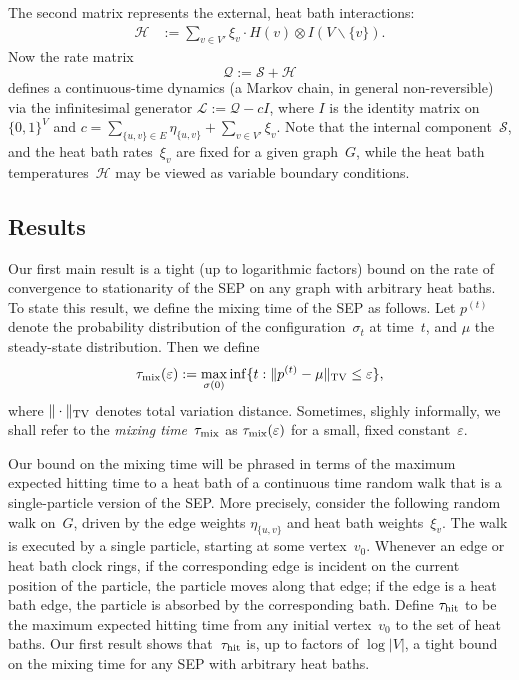 \documentclass[11pt]{article}
\theoremstyle{plain}
\theoremstyle{definition}
\theoremstyle{remark}
\numberwithin{equation}{section}
\newcommand{\cH}{{\mathcal H}}
\newcommand{\cL}{{\mathcal L}}
\newcommand{\cS}{{\mathcal S}}
\newcommand{\be}{\begin{equation}}
\newcommand{\ee}{\end{equation}}
\renewcommand{\cS}{{\mathcal Q}}
\newcommand{\cSin}{{\mathcal S}}
\newcommand{\tmix}{\tau_{\rm mix}}
\newcommand{\hit}{\tau_{\rm hit}}
\newcommand{\TVD}[2]{\Vert #1 - #2 \Vert_{\rm TV}}
\begin{document}
The second matrix represents the external, heat bath interactions:
\begin{align} \cH &:= \sum_{v \in V'} \xi_{v} \cdot H(v) \otimes I({V\backslash \{v\}})
\label{Hh}. \end{align}
Now the rate matrix \be \cS:=\cSin+\cH \label{cSdef} \ee
defines a continuous-time dynamics (a Markov chain, in general non-reversible) via the infinitesimal generator $\cL := \cS-cI$,
where $I$ is the identity matrix on $\{0,1\}^V$ and $c=\sum_{\{u,v\}\in E} \eta_{\{u,v\}}+\sum_{v\in V'} \xi_{v}$.  
Note that the internal component~$\cSin$, and the heat bath rates~$\xi_v$ are
fixed for a given graph~$G$, while the heat bath temperatures~$\cH$ may be viewed
as variable boundary conditions.


\subsection{Results}\label{subs:results}
Our first main result is a tight (up to logarithmic factors) bound on the rate of convergence to stationarity
of the SEP on any graph with arbitrary heat baths.  
To state this result, we define the mixing time of the SEP as follows.  Let $p^{(t)}$ denote the probability distribution
of the configuration~$\sigma_t$ at time~$t$, and $\mu$ the steady-state distribution.  Then we define
\begin{equation}
   \tmix(\varepsilon) := \max_{\sigma(0)}\inf\{t:\TVD{p^{(t)}}{\mu}\le\varepsilon\},
\end{equation}
where $\Vert \cdot\Vert_{\rm TV}$ denotes total variation distance.  Sometimes, slighly informally, we shall 
refer to the {\it mixing time\/}~$\tmix$ as $\tmix(\varepsilon)$ for a small, fixed constant~$\varepsilon$.

Our bound on the mixing time will be phrased in terms of the maximum expected hitting time to a heat bath
of a continuous time random walk that is a single-particle version of the SEP.
More precisely, consider the
following random walk on~$G$, driven by the edge weights $\eta_{\{u,v\}}$ and heat bath weights~$\xi_v$.
The walk is executed by a single particle, starting at some vertex~$v_0$.  Whenever an edge or heat
bath clock rings, if the corresponding edge is incident on the current position of the particle, the particle
moves along that edge; if  the edge is a heat bath edge, the particle is absorbed by the corresponding
bath.  Define $\hit$ to be the maximum expected hitting time from any initial vertex~$v_0$ to the set of 
heat baths.  Our first result shows that~$\hit$ is, up to factors of $\log|V|$,  a tight bound on the mixing time
for any SEP with arbitrary heat baths.
\end{document}
